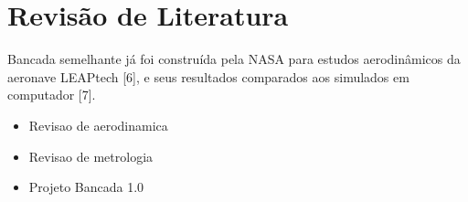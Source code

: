 \chapter{Revisão de Literatura}\label{chp:rev}

Bancada semelhante já foi construída pela NASA para estudos aerodinâmicos da aeronave LEAPtech [6], e seus resultados comparados aos simulados em computador [7].


\begin{itemize}
    \item Revisao de aerodinamica
    \item Revisao de metrologia
    \item Projeto Bancada 1.0
\end{itemize}